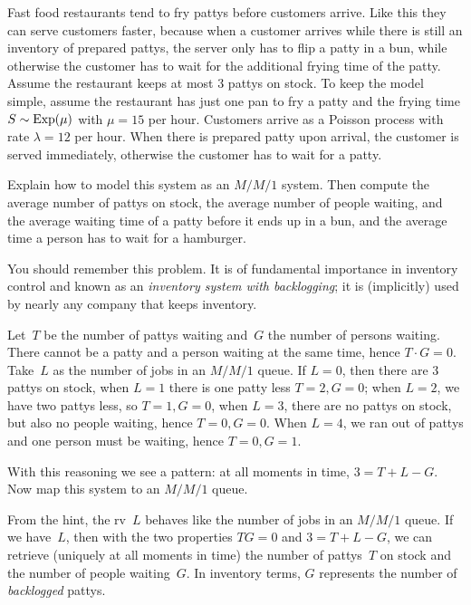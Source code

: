 \documentclass[stochastic-or.tex]{subfiles}
\begin{document}
\begin{exercise}\label{ex:95}
Fast food restaurants tend to fry pattys before customers arrive.
Like this they can serve customers faster, because when a customer arrives while there is still an inventory of prepared pattys, the server only has to flip a patty in a bun, while otherwise the customer has to wait for the additional frying time of the patty.
Assume the restaurant keeps at most 3 pattys on stock.
To keep the model simple, assume the restaurant has just one pan to fry a patty and the frying time $S\sim \mathrm{Exp}(\mu)$ with $\mu = 15$ per hour.
Customers arrive as a Poisson process with rate $\lambda=12$ per hour.
When there is prepared patty upon arrival, the customer is served immediately, otherwise the customer has to wait for a patty.

Explain how to model this system as an $M/M/1$ system.  Then compute the average number of pattys on stock, the average number of people waiting, and the average waiting time of a patty before it ends up in a bun, and the average time a person has to wait for a hamburger.

You should remember this problem.
It is of fundamental importance in inventory control and known as an \emph{inventory system with backlogging}; it is (implicitly) used by nearly any company that keeps inventory.
\begin{hint}
Let~$T$ be the number of pattys waiting and~$G$ the number of persons waiting.
There cannot be a patty and a person waiting at the same time, hence $T\cdot G = 0$.
Take~$L$ as the number of jobs in an $M/M/1$ queue.
If $L=0$, then there are 3 pattys on stock, when $L=1$ there is one patty less $T=2, G=0$; when $L=2$, we have two pattys less, so $T=1, G=0$, when $L=3$, there are no pattys on stock, but also no people waiting, hence $T=0, G=0$.
When $L=4$, we ran out of pattys and one person must be waiting, hence $T=0, G=1$.

With this reasoning we see a pattern:  at all moments in time, $3=T+L - G$.
Now map this system to an $M/M/1$ queue.
\end{hint}
\begin{solution}
From the hint, the rv~$L$ behaves like the number of jobs in an $M/M/1$ queue. If we have~$L$, then with the two properties $T G = 0$ and $3 = T +L - G$, we can retrieve (uniquely at all moments in time) the number of pattys~$T$ on stock and the number of people waiting~$G$. In inventory terms, $G$ represents the number of \emph{backlogged} pattys.


\end{solution}
\end{exercise}
\end{document}
